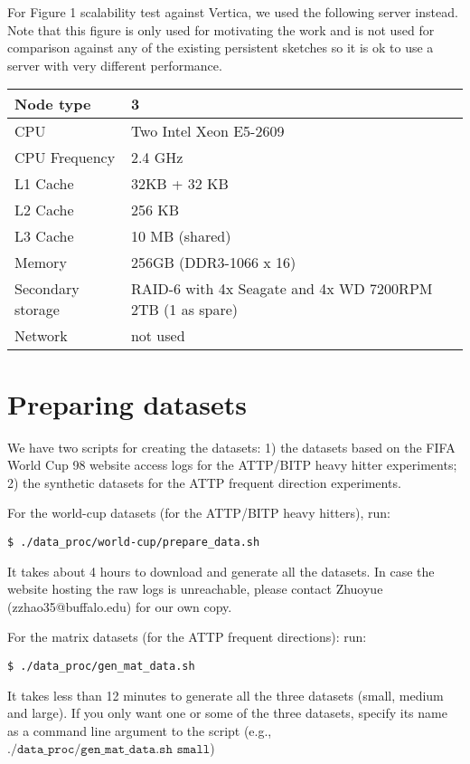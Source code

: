 \documentclass[11pt]{article}
\begin{document}
For Figure 1 scalability test against Vertica, we used the following
server instead. Note that this figure is only used for motivating the
work and is not used for comparison against any of the existing
persistent sketches so it is ok to use a server with very different
performance.

\vspace{1mm}
\begin{tabular}{|l|l|}
    \hline
	Node type &  3 \\\hline
	CPU & Two Intel Xeon E5-2609\\\hline
	CPU Frequency & 2.4 GHz \\\hline
	L1 Cache & 32KB + 32 KB \\\hline
	L2 Cache & 256 KB \\\hline
	L3 Cache & 10 MB (shared)  \\\hline
	Memory & 256GB (DDR3-1066 x 16)  \\\hline
	Secondary storage & RAID-6 with 4x Seagate and 4x WD 7200RPM 2TB
	(1 as spare) \\\hline
	Network & not used \\\hline
\end{tabular}
\vspace{1mm}


\section{Preparing datasets}

We have two scripts for creating the datasets: 1) the datasets based
on the FIFA World Cup 98 website access logs for the ATTP/BITP heavy
hitter experiments; 2) the synthetic datasets for the ATTP
frequent direction experiments. 

For the world-cup datasets (for the ATTP/BITP heavy hitters), run:
\begin{verbatim}
$ ./data_proc/world-cup/prepare_data.sh
\end{verbatim}
It takes about 4 hours to download and generate all the datasets. In
case the website hosting the raw logs is unreachable, please contact
Zhuoyue (zzhao35@buffalo.edu) for our own copy.

For the matrix datasets (for the ATTP frequent directions): run:
\begin{verbatim}
$ ./data_proc/gen_mat_data.sh
\end{verbatim}
It takes less than 12 minutes to generate all the three datasets (small,
medium and large). If you only want one or some of the three datasets,
specify its name as a command line argument to the script (e.g.,
$\texttt{./data\_proc/gen\_mat\_data.sh small}$)
\end{document}
